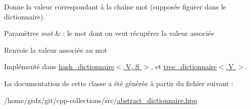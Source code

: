 Donne la valeur correspondant à la chaîne mot (supposée figurer dans le dictionnaire). 


\begin{DoxyParams}{Paramètres}
{\em mot} & \-: le mot dont on veut récupérer la valeur associée \\
\hline
\end{DoxyParams}
\begin{DoxyReturn}{Renvoie}
la valeur associée au mot 
\end{DoxyReturn}


Implémenté dans \hyperlink{classhash__dictionnaire_a7b7b3c0023fa68a6932d839feda7c1f2}{hash\-\_\-dictionnaire$<$ V, S $>$}, et \hyperlink{classtree__dictionnaire_a7fb5e78b2bf0d5e75c9aebb870d43879}{tree\-\_\-dictionnaire$<$ V $>$}.



La documentation de cette classe a été générée à partir du fichier suivant \-:\begin{DoxyCompactItemize}
\item 
/home/grdx/git/cpp-\/collections/src/\hyperlink{abstract__dictionnaire_8hpp}{abstract\-\_\-dictionnaire.\-hpp}\end{DoxyCompactItemize}

